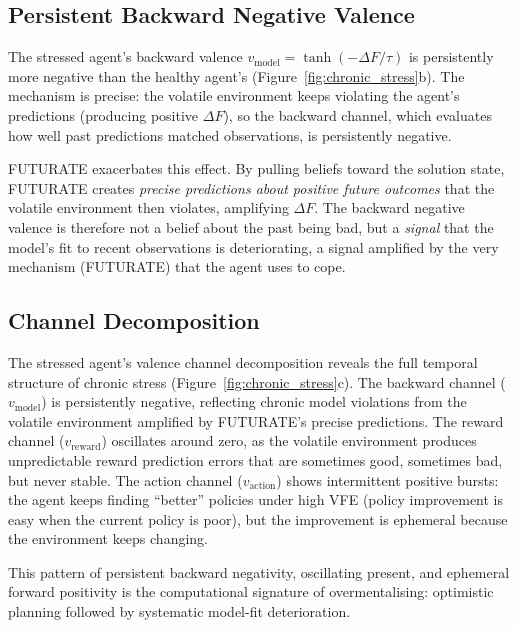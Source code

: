 \documentclass[11pt,a4paper]{article}
\begin{document}
\subsection{Persistent Backward Negative Valence}\label{sec:backward_negative}

The stressed agent's backward valence $v_{\text{model}} = \tanh(-\Delta F / \tau)$ is persistently more negative than the healthy agent's (Figure~\ref{fig:chronic_stress}b). The mechanism is precise: the volatile environment keeps violating the agent's predictions (producing positive $\Delta F$), so the backward channel, which evaluates how well past predictions matched observations, is persistently negative.

FUTURATE exacerbates this effect. By pulling beliefs toward the solution state, FUTURATE creates \emph{precise predictions about positive future outcomes} that the volatile environment then violates, amplifying $\Delta F$. The backward negative valence is therefore not a belief about the past being bad, but a \emph{signal} that the model's fit to recent observations is deteriorating, a signal amplified by the very mechanism (FUTURATE) that the agent uses to cope.

\subsection{Channel Decomposition}\label{sec:channel_decomp}

The stressed agent's valence channel decomposition reveals the full temporal structure of chronic stress (Figure~\ref{fig:chronic_stress}c). The backward channel ($v_{\text{model}}$) is persistently negative, reflecting chronic model violations from the volatile environment amplified by FUTURATE's precise predictions. The reward channel ($v_{\text{reward}}$) oscillates around zero, as the volatile environment produces unpredictable reward prediction errors that are sometimes good, sometimes bad, but never stable. The action channel ($v_{\text{action}}$) shows intermittent positive bursts: the agent keeps finding ``better'' policies under high VFE (policy improvement is easy when the current policy is poor), but the improvement is ephemeral because the environment keeps changing.

This pattern of persistent backward negativity, oscillating present, and ephemeral forward positivity is the computational signature of overmentalising: optimistic planning followed by systematic model-fit deterioration.
\end{document}
